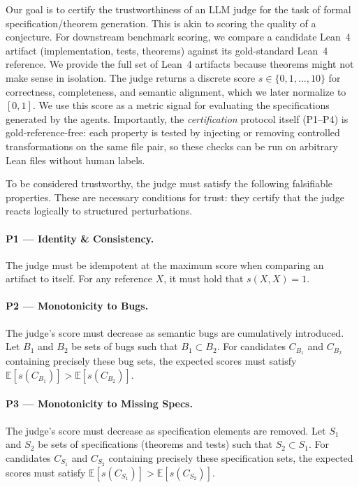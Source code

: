 \documentclass[numbers]{article}
\begin{document}
Our goal is to certify the trustworthiness of an LLM judge for the task of formal specification/theorem generation.
This is akin to scoring the quality of a conjecture.
For downstream benchmark scoring, we compare a candidate Lean~4 artifact (implementation, tests, theorems) against its gold-standard Lean~4 reference.
We provide the full set of Lean~4 artifacts because theorems might not make sense in isolation.
The judge returns a discrete score $s\in\{0,1,\dots,10\}$ for correctness, completeness, and semantic alignment, which we later normalize to $[0,1]$.
We use this score as a metric signal for evaluating the specifications generated by the agents.
Importantly, the \emph{certification} protocol itself (P1--P4) is gold-reference-free: each property is tested by injecting or removing controlled transformations on the same file pair, so these checks can be run on arbitrary Lean files without human labels.

To be considered trustworthy, the judge must satisfy the following falsifiable properties.
These are necessary conditions for trust: they certify that the judge reacts logically to structured perturbations.

\paragraph{P1 — Identity \& Consistency.}
The judge must be idempotent at the maximum score when comparing an artifact to itself.
For any reference $X$, it must hold that $s(X,X)=1$.

\paragraph{P2 — Monotonicity to Bugs.}
The judge’s score must decrease as semantic bugs are cumulatively introduced. Let $B_1$ and $B_2$ be sets of bugs such that $B_1 \subset B_2$. For candidates $C_{B_1}$ and $C_{B_2}$ containing precisely these bug sets, the expected scores must satisfy $\mathbb{E}[s(C_{B_1})] > \mathbb{E}[s(C_{B_2})]$.

\paragraph{P3 — Monotonicity to Missing Specs.}
The judge’s score must decrease as specification elements are removed.
Let $S_1$ and $S_2$ be sets of specifications (theorems and tests) such that $S_2 \subset S_1$.
For candidates $C_{S_1}$ and $C_{S_2}$ containing precisely these specification sets, the expected scores must satisfy $\mathbb{E}[s(C_{S_1})] > \mathbb{E}[s(C_{S_2})]$.
\end{document}
